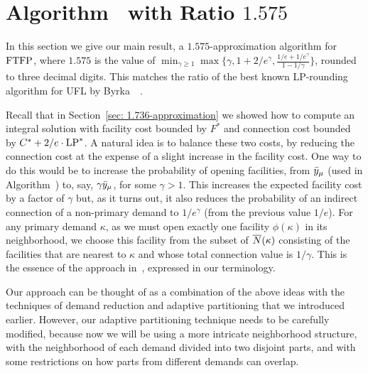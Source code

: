 

\section{Algorithm~{\EBGS} with Ratio $1.575$}\label{sec: 1.575-approximation}

In this section we give our main result, a $1.575$-approximation
algorithm for $\mbox{\rm FTFP}$, where $1.575$ is the value of $\min_{\gamma\geq
  1}\max\{\gamma, 1+2/e^\gamma, \frac{1/e+1/e^\gamma}{1-1/\gamma}\}$,
rounded to three decimal digits. This matches the ratio of the best
known LP-rounding algorithm for UFL by
Byrka~{\etal}~\cite{ByrkaGS10}. 

Recall that in Section~\ref{sec: 1.736-approximation} we showed how to compute an integral solution
with facility cost bounded by $F^\ast$ and connection cost bounded by
$C^\ast + 2/e\cdot\mbox{\rm LP}^\ast$. A natural idea is to balance these two
costs, by reducing the connection cost at the expense of a slight
increase in the facility cost. One way to do this would be to increase the
probability of opening facilities, from ${\bar y}_{\mu}$ (used in Algorithm~{\ECHS})
to, say, $\gamma{\bar y}_{\mu}$, for some $\gamma > 1$. This increases the
expected facility cost by a factor of $\gamma$ but, as it turns out,
it also reduces the probability of an indirect connection of a non-primary demand
to $1/e^\gamma$ (from the previous value $1/e$). For any primary demand $\kappa$, as we
must open exactly one facility $\phi(\kappa)$ in its neighborhood, we choose this
facility from the subset of ${\overline{N}}(\kappa)$ consisting of the facilities that
are nearest to $\kappa$ and whose total connection value is $1/\gamma$.
This is the essence of the approach in~\cite{ByrkaGS10}, expressed in our terminology.

Our approach can be thought of as a combination of the above ideas
with the techniques of demand reduction and
adaptive partitioning that we introduced earlier. However, our
adaptive partitioning technique needs to be carefully modified,
because now we will be using a more intricate neighborhood structure,
with the neighborhood of each demand divided into two disjoint parts,
and with some restrictions on how parts from different demands can overlap.

